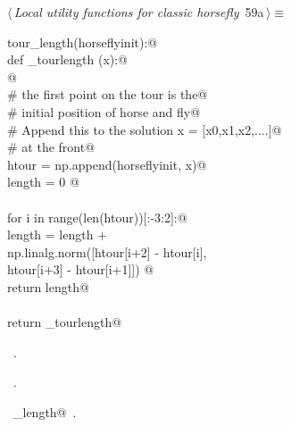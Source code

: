 \documentclass[11.5pt]{report}
\begin{document}
\begin{flushleft} \small\label{scrap81}\raggedright\small
{} $\langle\,${\itshape Local utility functions for classic horsefly}\nobreak\ {\footnotesize {59a}}$\,\rangle\equiv$
\vspace{-1ex}
\begin{list}{}{} \item
\mbox{}\verb@def tour_length(horseflyinit):@\\
\mbox{}\verb@   def _tourlength (x):@\\
\mbox{}\verb@         @\\
\mbox{}\verb@        # the first point on the tour is the@\\
\mbox{}\verb@        # initial position of horse and fly@\\
\mbox{}\verb@        # Append this to the solution x = [x0,x1,x2,....]@\\
\mbox{}\verb@        # at the front@\\
\mbox{}\verb@        htour = np.append(horseflyinit, x)@\\
\mbox{}\verb@        length = 0 @\\
\mbox{}\verb@@\\
\mbox{}\verb@        for i in range(len(htour))[:-3:2]:@\\
\mbox{}\verb@                length = length + \@\\
\mbox{}\verb@                         np.linalg.norm([htour[i+2] - htour[i], \@\\
\mbox{}\verb@                                         htour[i+3] - htour[i+1]]) @\\
\mbox{}\verb@        return length@\\
\mbox{}\verb@@\\
\mbox{}\verb@   return _tourlength@\\
\mbox{}\verb@@{\NWsep}
\end{list}
\vspace{-1.5ex}
\footnotesize
\begin{list}{}{\setlength{\itemsep}{-\parsep}\setlength{\itemindent}{-\leftmargin}}
\item \NWtxtMacroDefBy\ .
\item \NWtxtMacroRefIn\ .
\item \NWtxtIdentsDefed\nobreak\  \verb@tour_length@\nobreak\ .
\item{}
\end{list}
\vspace{4ex}
\end{flushleft}
\end{document}

